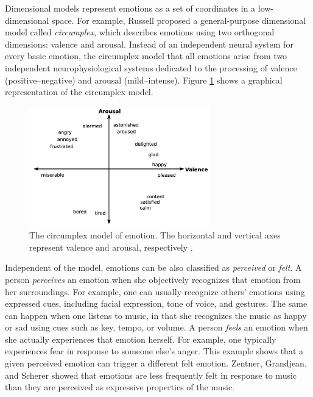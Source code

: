 Dimensional models represent emotions as a set of coordinates in a low-dimensional space. For example, Russell \cite{russell1980circumplex} proposed a general-purpose dimensional model called \textit{circumplex}, which describes emotions using two orthogonal dimensions: valence and arousal. Instead of an independent neural system for every basic emotion, the circumplex model that all emotions arise from two independent neurophysiological systems dedicated to the processing of valence (positive--negative) and arousal (mild--intense). Figure \ref{fig:circumplex} shows a graphical representation of the circumplex model.

\begin{figure}[!h]
\centering
\includegraphics[width=0.7\textwidth]{imgs/related_work/circumplex.png}
\caption{The circumplex model of emotion. The horizontal and vertical axes represent valence and arousal,
respectively \cite{russell1980circumplex}.}
\label{fig:circumplex}
\end{figure}

Independent of the model, emotions can be also classified as \textit{perceived} or \textit{felt}.
A person \textit{perceives} an emotion when she objectively recognizes that emotion from her surroundings. For example, one can usually recognize others' emotions using expressed cues, including facial expression, tone of voice, and gestures. The same can happen when one listens to music, in that she recognizes the music as happy or sad using cues such as key, tempo, or volume. A person \textit{feels} an emotion when she actually experiences that emotion herself. For example, one typically experiences fear in response to someone else's anger. This example shows that a given perceived emotion can trigger a different felt emotion. Zentner, Grandjean, and Scherer \cite{zentner2008emotions} showed that emotions are less frequently felt in response to music than they are perceived as expressive properties of the music.

